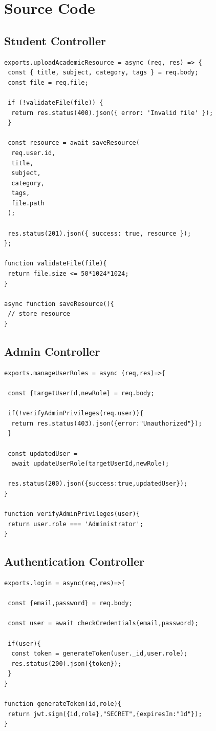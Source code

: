 \documentclass[12pt,a4paper]{report}
\begin{document}
\chapter{Source Code}

\section{Student Controller}

\begin{lstlisting}
exports.uploadAcademicResource = async (req, res) => {
 const { title, subject, category, tags } = req.body;
 const file = req.file;

 if (!validateFile(file)) {
  return res.status(400).json({ error: 'Invalid file' });
 }

 const resource = await saveResource(
  req.user.id,
  title,
  subject,
  category,
  tags,
  file.path
 );

 res.status(201).json({ success: true, resource });
};

function validateFile(file){
 return file.size <= 50*1024*1024;
}

async function saveResource(){
 // store resource
}
\end{lstlisting}
\newpage
\section{Admin Controller}

\begin{lstlisting}
exports.manageUserRoles = async (req,res)=>{

 const {targetUserId,newRole} = req.body;

 if(!verifyAdminPrivileges(req.user)){
  return res.status(403).json({error:"Unauthorized"});
 }

 const updatedUser =
  await updateUserRole(targetUserId,newRole);

 res.status(200).json({success:true,updatedUser});
}

function verifyAdminPrivileges(user){
 return user.role === 'Administrator';
}
\end{lstlisting}

\section{Authentication Controller}

\begin{lstlisting}
exports.login = async(req,res)=>{

 const {email,password} = req.body;

 const user = await checkCredentials(email,password);

 if(user){
  const token = generateToken(user._id,user.role);
  res.status(200).json({token});
 }
}

function generateToken(id,role){
 return jwt.sign({id,role},"SECRET",{expiresIn:"1d"});
}
\end{lstlisting}
\end{document}
